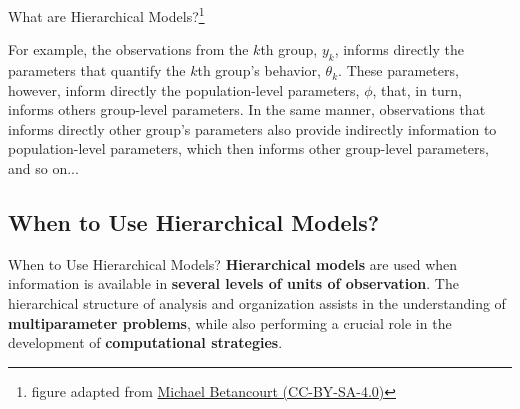 \begin{frame}{What are Hierarchical Models?\footnote{figure adapted from \href{https://betanalpha.github.io/assets/case_studies/hierarchical_modeling.html}{Michael Betancourt (CC-BY-SA-4.0)}}}
\begin{adjustbox}{max width=1.0\textwidth}
	\end{adjustbox}

	\footnotesize
	For example, the observations from the $k$th group, $y_k$,
	informs directly the parameters that quantify the $k$th group's behavior,
	$\theta_k$.
	These parameters, however, inform directly the population-level parameters,
	$\phi$, that, in turn, informs others group-level parameters.
	In the same manner, observations that informs directly other group's parameters
	also provide indirectly information to population-level parameters,
	which then informs other group-level parameters, and so on...
\end{frame}

\subsection{When to Use Hierarchical Models?}
\begin{frame}{When to Use Hierarchical Models?}
	\textbf{Hierarchical models} are used when information is available in
	\textbf{several levels of units of observation}.
	The hierarchical structure of analysis and organization assists in the
	understanding of \textbf{multiparameter problems},
	while also performing a crucial role in the development of
	\textbf{computational strategies}.
\end{frame}

